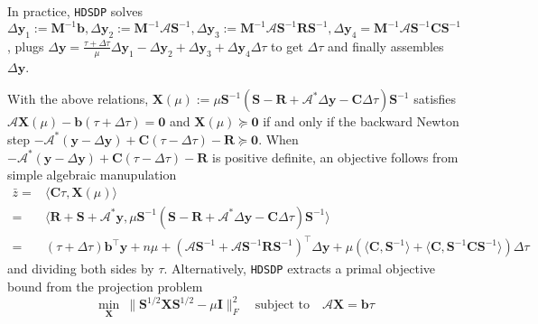In practice, {{\texttt{HDSDP}}} solves $\Delta \mathbf{y}_1 := \mathbf{M}^{- 1} \mathbf{b},
\Delta \mathbf{y}_2 := \mathbf{M}^{- 1} \mathcal{A} \mathbf{S}^{- 1}, \Delta \mathbf{y}_3 := \mathbf{M}^{- 1} \mathcal{A}
\mathbf{S}^{- 1} \mathbf{R} \mathbf{S}^{- 1}, \Delta \mathbf{y}_4 = \mathbf{M}^{- 1} \mathcal{A} \mathbf{S}^{- 1} \mathbf{C} \mathbf{S}^{-
1}$, plugs $\Delta \mathbf{y} = \frac{\tau + \Delta \tau}{\mu} \Delta \mathbf{y}_1 - \Delta
\mathbf{y}_2 + \Delta \mathbf{y}_3 + \Delta \mathbf{y}_4 \Delta \tau$ to get $\Delta \tau$ and finally assembles $\Delta \mathbf{y}$.

 With the above relations, $\mathbf{X} (\mu) := \mu \mathbf{S}^{- 1}
( \mathbf{S} - \mathbf{R} +\mathcal{A}^{\ast} \Delta \mathbf{y} - \mathbf{C} \Delta \tau ) \mathbf{S}^{-
1}$ satisfies $\mathcal{A} \mathbf{X} (\mu) - \mathbf{b} (\tau + \Delta \tau) = \textbf{0}$ and $\mathbf{X} (\mu)
\succeq \textbf{0}$ if and only if the backward Newton step $-\mathcal{A}^{\ast} ( \mathbf{y} - \Delta \mathbf{y} ) + \mathbf{C} (\tau
- \Delta \tau) - \mathbf{R} \succeq \textbf{0}$. When $-\mathcal{A}^{\ast} ( \mathbf{y} -
\Delta \mathbf{y} ) + \mathbf{C} (\tau - \Delta \tau) - \mathbf{R}$ is positive definite, an
objective follows from simple algebraic manupulation
\begin{align*}
\bar{z}  ={} & \langle \mathbf{C} \tau, \mathbf{X} (\mu) \rangle\\
	  ={} & \langle \mathbf{R} + \mathbf{S} + \mathcal{A}^{\ast} \mathbf{y}, \mu \mathbf{S}^{- 1} ( \mathbf{S} - \mathbf{R}
  +\mathcal{A}^{\ast} \Delta \mathbf{y} - \mathbf{C} \Delta \tau ) \mathbf{S}^{- 1}
  \rangle\\
  ={} & (\tau + \Delta \tau) \mathbf{b}^{\top} \mathbf{y} + n \mu + ( \mathcal{A} \mathbf{S}^{- 1} +
  \mathcal{A} \mathbf{S}^{- 1} \mathbf{R} \mathbf{S}^{- 1} )^{\top} \Delta \mathbf{y} + \mu (
  \langle \mathbf{C}, \mathbf{S}^{- 1} \rangle + \langle \mathbf{C}, \mathbf{S}^{- 1} \mathbf{C}
  \mathbf{S}^{- 1} \rangle ) \Delta \tau
\end{align*}
and dividing both sides by $\tau$. Alternatively, {{\texttt{HDSDP}}} extracts a primal
objective bound from the projection problem
\[   \min_{\mathbf{X}} ~ \| \mathbf{S}^{1 / 2} \mathbf{X} \mathbf{S}^{1 / 2} - \mu \mathbf{I} \|_F^2 \quad \text{subject to} \quad \mathcal{A} \mathbf{X} = \mathbf{b} \tau \]

